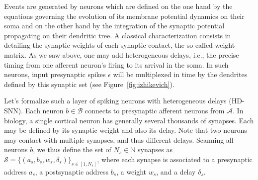 \documentclass[runningheads]{llncs}
\newcommand{\presynaddr}{a} %
\newcommand{\postsynaddr}{b} %
\newcommand{\presynaddrspace}{\mathcal{A}} %
\newcommand{\postsynaddrspace}{\mathcal{B}} %
\newcommand{\synapse}{\mathcal{S}} %
\newcommand{\synapticweight}{w} %
\newcommand{\synapticdelay}{\delta} %
\newcommand{\ranksyn}{s} %
\newcommand{\Nsyn}{N_{s}} %
\newcommand{\event}{\epsilon} %
\begin{document}
Events are generated by neurons which are defined on the one hand by the equations governing the evolution of its membrane potential dynamics on their soma and on the other hand by the integration of the synaptic potential propagating on their dendritic tree. A classical characterization consists in detailing the synaptic weights of each synaptic contact, the so-called weight matrix. As we saw above, one may add heterogeneous delays, i.e., the precise timing from one afferent neuron's firing to its arrival in the soma. %
In such neurons, %
input presynaptic spikes $\event$ will be multiplexed in time by the dendrites defined by this synaptic set (see Figure~\ref{fig:izhikevich}). %

Let's formalize such a layer of spiking neurons with heterogeneous delays (HD-SNN). Each neuron $\postsynaddr \in \postsynaddrspace$  connects to presynaptic afferent neurons from $\presynaddrspace$. In biology, a single cortical neuron has generally several thousands of synapses. Each may be defined by its synaptic weight and also its delay. %
Note that two neurons may contact with multiple synapses, and thus different delays. Scanning all neurons $\postsynaddr$, we thus define the set of $\Nsyn \in \mathbb{N}$ synapses  as  $\synapse = \{(\presynaddr_\ranksyn, \postsynaddr_\ranksyn, \synapticweight_\ranksyn, \synapticdelay_\ranksyn)\}_{\ranksyn \in [1,\Nsyn]}$, where each synapse is associated to a presynaptic address $\presynaddr_\ranksyn$, a postsynaptic address $\postsynaddr_\ranksyn$,  a weight $\synapticweight_\ranksyn$, and a delay $\synapticdelay_\ranksyn$. 
\end{document}
